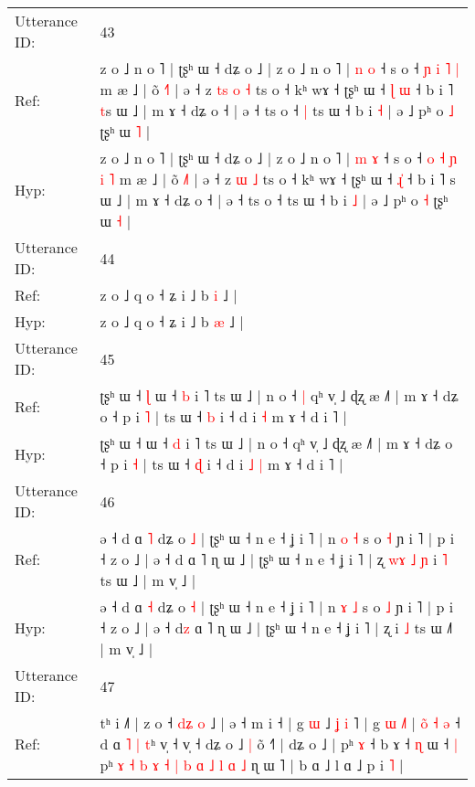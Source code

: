\documentclass[10pt]{article}
\DeclareRobustCommand{\hl}[1]{{\textcolor{red}{#1}}}
\begin{document}
\begin{longtable}{ll}
 \\
\midrule
Utterance ID: & 43 \\
Ref: & z o ˩ n o ˥ | ʈʂʰ ɯ ˧ dʑ o ˩ | z o ˩ n o ˥ | \hl{n} \hl{o} ˧ s o ˧\hl{}\hl{} \hl{ɲ} \hl{i} \hl{˥} \hl{|} m æ ˩ | õ \hl{˧}˥ | ə ˧ z\hl{ }\hl{t}\hl{s} \hl{o} \hl{˧} ts o ˧ kʰ wɤ ˧ ʈʂʰ ɯ ˧ \hl{ɭ}\hl{ }\hl{ɯ} ˧ b i ˥ \hl{t}s ɯ ˩ | m ɤ ˧ dʑ o ˧ | ə ˧ ts o ˧\hl{ }\hl{|} ts ɯ ˧ b i \hl{˧} | ə ˩ pʰ o \hl{˩} ʈʂʰ ɯ \hl{˥} |
 \\
Hyp: & z o ˩ n o ˥ | ʈʂʰ ɯ ˧ dʑ o ˩ | z o ˩ n o ˥ | \hl{m} \hl{ɤ} ˧ s o ˧\hl{ }\hl{o} \hl{˧} \hl{ɲ} \hl{i} \hl{˥} m æ ˩ | õ \hl{˩}˥ | ə ˧ z\hl{}\hl{}\hl{} \hl{ɯ} \hl{˩} ts o ˧ kʰ wɤ ˧ ʈʂʰ ɯ ˧ \hl{}\hl{ɻ}\hl{̍} ˧ b i ˥ \hl{}s ɯ ˩ | m ɤ ˧ dʑ o ˧ | ə ˧ ts o ˧\hl{}\hl{} ts ɯ ˧ b i \hl{˩} | ə ˩ pʰ o \hl{˧} ʈʂʰ ɯ \hl{˧} |
 \\
\midrule
Utterance ID: & 44 \\
Ref: & z o ˩ q o ˧ ʑ i ˩ b \hl{i} ˩ |
 \\
Hyp: & z o ˩ q o ˧ ʑ i ˩ b \hl{æ} ˩ |
 \\
\midrule
Utterance ID: & 45 \\
Ref: & ʈʂʰ ɯ ˧\hl{ }\hl{ɭ} ɯ ˧ \hl{b} i ˥ ts ɯ ˩ | n o ˧\hl{ }\hl{|} qʰ v̩ ˩ ɖʐ æ ˩˥ | m ɤ ˧ dʑ o ˧ p i \hl{˥} | ts ɯ ˧ \hl{b} i ˧ d i\hl{}\hl{} \hl{˧} m ɤ ˧ d i ˥ |
 \\
Hyp: & ʈʂʰ ɯ ˧\hl{}\hl{} ɯ ˧ \hl{d} i ˥ ts ɯ ˩ | n o ˧\hl{}\hl{} qʰ v̩ ˩ ɖʐ æ ˩˥ | m ɤ ˧ dʑ o ˧ p i \hl{˧} | ts ɯ ˧ \hl{ɖ} i ˧ d i\hl{ }\hl{˩} \hl{|} m ɤ ˧ d i ˥ |
 \\
\midrule
Utterance ID: & 46 \\
Ref: & ə ˧ d ɑ \hl{˥} dʑ o \hl{˩} | ʈʂʰ ɯ ˧ n e ˧ ʝ i ˥ | n \hl{o} \hl{˧} s o \hl{˧} ɲ i ˥ | p i ˧ z o ˩ | ə ˧ d\hl{} ɑ ˥ ɳ ɯ ˩ | ʈʂʰ ɯ ˧ n e ˧ ʝ i ˥ | ʐ\hl{ }\hl{w}\hl{ɤ}\hl{ }\hl{˩}\hl{ }\hl{ɲ} i \hl{˥} ts ɯ ˩\hl{} | m v̩ ˩ |
 \\
Hyp: & ə ˧ d ɑ \hl{˧} dʑ o \hl{˧} | ʈʂʰ ɯ ˧ n e ˧ ʝ i ˥ | n \hl{ɤ} \hl{˩} s o \hl{˩} ɲ i ˥ | p i ˧ z o ˩ | ə ˧ d\hl{z} ɑ ˥ ɳ ɯ ˩ | ʈʂʰ ɯ ˧ n e ˧ ʝ i ˥ | ʐ\hl{}\hl{}\hl{}\hl{}\hl{}\hl{}\hl{} i \hl{˩} ts ɯ ˩\hl{˥} | m v̩ ˩ |
 \\
\midrule
Utterance ID: & 47 \\
Ref: & tʰ i ˩˥ | z o ˧ \hl{d}\hl{ʑ} \hl{o} ˩\hl{} | ə ˧ m i ˧ | g \hl{ɯ} ˩\hl{ }\hl{ʝ}\hl{ }\hl{i}\hl{ }˥ | g \hl{ɯ} \hl{˩}˥ |\hl{ }\hl{o}\hl{̃}\hl{ }\hl{˧} \hl{ə} ˧ d ɑ \hl{˥} \hl{|}\hl{ }\hl{t}ʰ v̩ ˧ v̩ ˧ dʑ o ˩\hl{ }\hl{|} õ ˧˥ | dʑ o ˩ | pʰ \hl{ɤ} ˧ b ɤ ˧ \hl{ɳ} ɯ ˧\hl{ }\hl{|} pʰ \hl{ɤ} \hl{˧} \hl{b} \hl{ɤ} \hl{˧} \hl{|} \hl{b} \hl{ɑ} \hl{˩} \hl{l} \hl{ɑ} \hl{˩} ɳ ɯ ˥ | b ɑ ˩ l ɑ ˩\hl{}\hl{} p i \hl{˥} |

\end{longtable}
\end{document}
